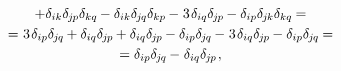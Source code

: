 \begin{equation*}
\begin{array}{c}
+ \delta_{ik} \delta_{\hspace{-0.1ex}j\hspace{-0.1ex}p} \delta_{kq} \hspace{-0.1ex}
- \delta_{ik} \delta_{\hspace{-0.1ex}j\hspace{-0.1ex}q} \delta_{kp} \hspace{-0.1ex}
- \hspace{.1ex} 3 \hspace{.2ex} \delta_{iq} \delta_{\hspace{-0.1ex}j\hspace{-0.1ex}p} \hspace{-0.1ex}
- \delta_{ip} \delta_{\hspace{-0.1ex}j\hspace{-0.1ex}k} \delta_{kq} \hspace{-0.1ex} =
\\[.25em]
%
= \hspace{.1ex} 3 \hspace{.2ex} \delta_{ip} \delta_{\hspace{-0.1ex}j\hspace{-0.1ex}q} \hspace{-0.1ex}
+ \delta_{iq} \delta_{\hspace{-0.1ex}j\hspace{-0.1ex}p} \hspace{-0.1ex}
+ \delta_{iq} \delta_{\hspace{-0.1ex}j\hspace{-0.1ex}p} \hspace{-0.1ex}
- \delta_{ip} \delta_{\hspace{-0.1ex}j\hspace{-0.1ex}q} \hspace{-0.1ex}
- \hspace{.1ex} 3 \hspace{.2ex} \delta_{iq} \delta_{\hspace{-0.1ex}j\hspace{-0.1ex}p} \hspace{-0.1ex}
- \delta_{ip} \delta_{\hspace{-0.1ex}j\hspace{-0.1ex}q} \hspace{-0.1ex} =
\\[.25em]
%
= \delta_{ip} \delta_{\hspace{-0.1ex}j\hspace{-0.1ex}q} \hspace{-0.1ex}
- \hspace{.1ex} \delta_{iq} \delta_{\hspace{-0.1ex}j\hspace{-0.1ex}p}
\hspace{.2ex} ,
\end{array}\end{equation*}

